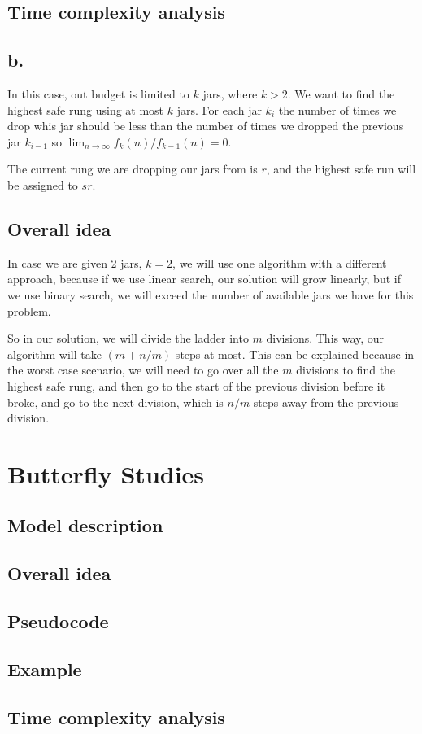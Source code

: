 \documentclass{article}
\begin{document}
\subsection*{Time complexity analysis}

\subsection*{b.}

In this case, out budget is limited to $k$ jars, where $k>2$. We want to find the highest safe rung using at most $k$ jars. For each jar $k_i$ the number of times we drop whis jar should be less than the number of times we dropped the previous jar $k_{i-1}$ so $\lim_{n\to\infty} f_k(n)/f_{k-1}(n) = 0$.

The current rung we are dropping our jars from is $r$, and the highest safe run will be assigned to $sr$.

\subsection*{Overall idea}

In case we are given 2 jars, $k = 2$, we will use one algorithm with a different approach, because if we use linear search, our solution will grow linearly, but if we use binary search, we will exceed the number of available jars we have for this problem.

So in our solution, we will divide the ladder into $m$ divisions. This way, our algorithm will take $(m+n/m)$ steps at most. This can be explained because in the worst case scenario, we will need to go over all the $m$ divisions to find the highest safe rung, and then go to the start of the previous division before it broke, and go to the next division, which is $n/m$ steps away from the previous division.


\section*{Butterfly Studies}

\subsection*{Model description}

\subsection*{Overall idea}

\subsection*{Pseudocode}

\subsection*{Example}

\subsection*{Time complexity analysis}
\end{document}
